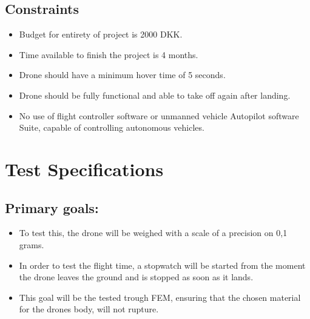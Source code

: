 \documentclass[titlepage,a4paper,11pt]{article}
\begin{document}
\subsection{Constraints}

\begin{itemize}
    \item
          Budget for entirety of project is 2000 DKK.
    \item
          Time available to finish the project is 4 months.
    \item
          Drone should have a minimum hover time of 5 seconds.
    \item
          Drone should be fully functional and able to take off again after landing.
    \item
          No use of flight controller software or unmanned vehicle Autopilot software Suite, capable of controlling autonomous vehicles.
\end{itemize}


\section {Test Specifications}
\subsection{Primary goals:}
\begin{itemize}
    \item
          To test this, the drone will be weighed with a scale of a precision on 0,1 grams.
    \item
          In order to test the flight time, a stopwatch will be started from the moment the drone leaves the ground and is stopped as soon as it lands.
    \item
          This goal will be the tested trough FEM, ensuring that the chosen material for the drones body, will not rupture.
\end{itemize}
\end{document}

